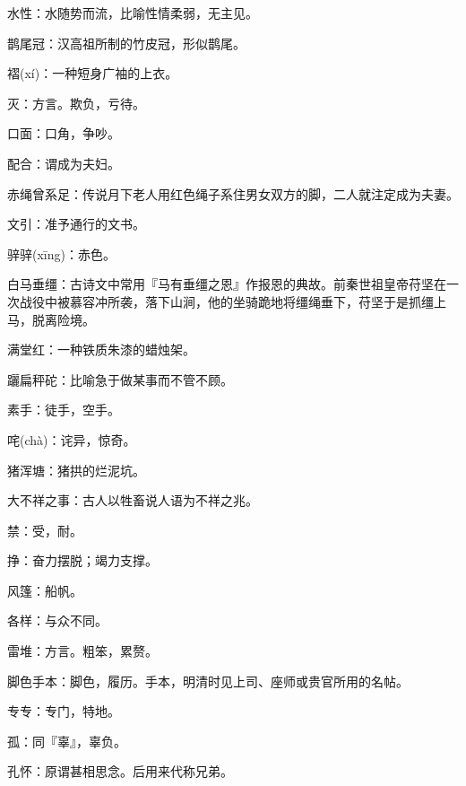 \startbuffer[1100]
水性：水随势而流，比喻性情柔弱，无主见。
\stopbuffer


\startbuffer[1101]
鹊尾冠：汉高祖所制的竹皮冠，形似鹊尾。
\stopbuffer


\startbuffer[1102]
褶(xí)：一种短身广袖的上衣。
\stopbuffer


\startbuffer[1103]
灭：方言。欺负，亏待。
\stopbuffer


\startbuffer[1104]
口面：口角，争吵。
\stopbuffer


\startbuffer[1105]
配合：谓成为夫妇。
\stopbuffer


\startbuffer[1106]
赤绳曾系足：传说月下老人用红色绳子系住男女双方的脚，二人就注定成为夫妻。
\stopbuffer


\startbuffer[1107]
文引：准予通行的文书。
\stopbuffer


\startbuffer[1108]
骍骍(xīng)：赤色。
\stopbuffer


\startbuffer[1109]
白马垂缰：古诗文中常用『马有垂缰之恩』作报恩的典故。前秦世祖皇帝苻坚在一次战役中被慕容冲所袭，落下山涧，他的坐骑跪地将缰绳垂下，苻坚于是抓缰上马，脱离险境。
\stopbuffer


\startbuffer[1110]
满堂红：一种铁质朱漆的蜡烛架。
\stopbuffer


\startbuffer[1111]
躧扁秤砣：比喻急于做某事而不管不顾。
\stopbuffer


\startbuffer[1112]
素手：徒手，空手。
\stopbuffer


\startbuffer[1113]
咤(chà)：诧异，惊奇。
\stopbuffer


\startbuffer[1114]
猪浑塘：猪拱的烂泥坑。
\stopbuffer


\startbuffer[1115]
大不祥之事：古人以牲畜说人语为不祥之兆。
\stopbuffer


\startbuffer[1116]
禁：受，耐。
\stopbuffer


\startbuffer[1117]
挣：奋力摆脱；竭力支撑。
\stopbuffer


\startbuffer[1118]
风篷：船帆。
\stopbuffer


\startbuffer[1119]
各样：与众不同。
\stopbuffer


\startbuffer[1120]
雷堆：方言。粗笨，累赘。
\stopbuffer


\startbuffer[1121]
脚色手本：脚色，履历。手本，明清时见上司、座师或贵官所用的名帖。
\stopbuffer


\startbuffer[1122]
专专：专门，特地。
\stopbuffer


\startbuffer[1123]
孤：同『辜』，辜负。
\stopbuffer


\startbuffer[1124]
孔怀：原谓甚相思念。后用来代称兄弟。
\stopbuffer


